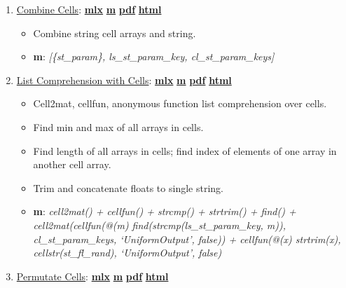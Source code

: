 \documentclass[
]{book}
\providecommand{\tightlist}{%
  \setlength{\itemsep}{0pt}\setlength{\parskip}{0pt}}
\begin{document}
\begin{enumerate}
\def\labelenumi{\arabic{enumi}.}
\tightlist
\item
  \href{https://fanwangecon.github.io/M4Econ/amto/cell/htmlpdfm/fs_cellscombine.html}{Combine Cells}: \href{https://github.com/FanWangEcon/M4Econ/blob/master/amto/cell/fs_cellscombine.mlx}{\textbf{mlx}} \textbar{} \href{https://github.com/FanWangEcon/M4Econ/blob/master/amto/cell/htmlpdfm/fs_cellscombine.m}{\textbf{m}} \textbar{} \href{https://github.com/FanWangEcon/M4Econ/blob/master/amto/cell/htmlpdfm/fs_cellscombine.pdf}{\textbf{pdf}} \textbar{} \href{https://fanwangecon.github.io/M4Econ/amto/cell/htmlpdfm/fs_cellscombine.html}{\textbf{html}}

  \begin{itemize}
  \tightlist
  \item
    Combine string cell arrays and string.
  \item
    \textbf{m}: \emph{{[}\{st\_param\}, ls\_st\_param\_key, cl\_st\_param\_keys{]}}
  \end{itemize}
\item
  \href{https://fanwangecon.github.io/M4Econ/amto/cell/htmlpdfm/fs_cellfuns.html}{List Comprehension with Cells}: \href{https://github.com/FanWangEcon/M4Econ/blob/master/amto/cell/fs_cellfuns.mlx}{\textbf{mlx}} \textbar{} \href{https://github.com/FanWangEcon/M4Econ/blob/master/amto/cell/htmlpdfm/fs_cellfuns.m}{\textbf{m}} \textbar{} \href{https://github.com/FanWangEcon/M4Econ/blob/master/amto/cell/htmlpdfm/fs_cellfuns.pdf}{\textbf{pdf}} \textbar{} \href{https://fanwangecon.github.io/M4Econ/amto/cell/htmlpdfm/fs_cellfuns.html}{\textbf{html}}

  \begin{itemize}
  \tightlist
  \item
    Cell2mat, cellfun, anonymous function list comprehension over cells.
  \item
    Find min and max of all arrays in cells.
  \item
    Find length of all arrays in cells; find index of elements of one array in another cell array.
  \item
    Trim and concatenate floats to single string.
  \item
    \textbf{m}: \emph{cell2mat() + cellfun() + strcmp() + strtrim() + find() + cell2mat(cellfun(@(m) find(strcmp(ls\_st\_param\_key, m)), cl\_st\_param\_keys, `UniformOutput', false)) + cellfun(@(x) strtrim(x), cellstr(st\_fl\_rand), `UniformOutput', false)}
  \end{itemize}
\item
  \href{https://fanwangecon.github.io/M4Econ/amto/cell/htmlpdfm/fs_cellscombinations.html}{Permutate Cells}: \href{https://github.com/FanWangEcon/M4Econ/blob/master/amto/cell/fs_cellscombinations.mlx}{\textbf{mlx}} \textbar{} \href{https://github.com/FanWangEcon/M4Econ/blob/master/amto/cell/htmlpdfm/fs_cellscombinations.m}{\textbf{m}} \textbar{} \href{https://github.com/FanWangEcon/M4Econ/blob/master/amto/cell/htmlpdfm/fs_cellscombinations.pdf}{\textbf{pdf}} \textbar{} \href{https://fanwangecon.github.io/M4Econ/amto/cell/htmlpdfm/fs_cellscombinations.html}{\textbf{html}}


\end{enumerate}
\end{document}
